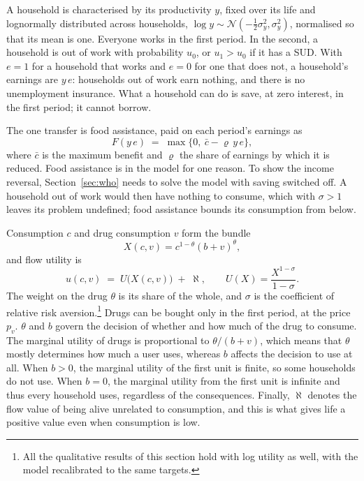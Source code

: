 \documentclass[10pt]{article}
\begin{document}
A household is characterised by its productivity $y$, fixed over its life and lognormally distributed across households, $\log y \sim \mathcal{N}(-\tfrac12\sigma_y^2, \sigma_y^2)$, normalised so that its mean is one. Everyone works in the first period. In the second, a household is out of work with probability $u_0$, or $u_1>u_0$ if it has a SUD. With $e=1$ for a household that works and $e=0$ for one that does not, a household's earnings are $y\,e$: households out of work earn nothing, and there is no unemployment insurance. What a household can do is save, at zero interest, in the first period; it cannot borrow.

The one transfer is food assistance, paid on each period's earnings as
\begin{equation}\label{eq:fs}
F(y\,e) \;=\; \max\{0,\ \bar c-\varrho\, y\,e\},
\end{equation}
where $\bar c$ is the maximum benefit and $\varrho$ the share of earnings by which it is reduced. Food assistance is in the model for one reason. To show the income reversal, Section~\ref{sec:who} needs to solve the model with saving switched off. A household out of work would then have nothing to consume, which with $\sigma>1$ leaves its problem undefined; food assistance bounds its consumption from below.

Consumption $c$ and drug consumption $v$ form the bundle
\begin{equation}\label{eq:bundles}
X(c,v)=c^{1-\theta}(b+v)^{\theta},
\end{equation}
and flow utility is
\begin{equation}\label{eq:u}
u(c,v) \;=\; U\big(X(c,v)\big)\;+\;\aleph,
\qquad U(X)=\frac{X^{1-\sigma}}{1-\sigma}.
\end{equation}
The weight on the
drug $\theta$ is its share of the whole, and $\sigma$ is the coefficient of relative
risk aversion.\footnote{All the qualitative results of this section hold with log utility as well, with the model recalibrated to the same targets.} Drugs can be bought only in the first period, at the price $p_v$.   $\theta$ and $b$ govern the decision of whether and how much of the drug to consume. The marginal utility of drugs is proportional to $\theta/(b+v)$, which means that $\theta$ mostly determines how much a user uses, whereas $b$ affects the decision to use at all. When $b>0$, the marginal utility of the first unit is finite, so some households do not use. When $b=0$, the marginal utility from the first unit is infinite and thus every household uses, regardless of the consequences. Finally, $\aleph$ denotes the flow value of being alive unrelated to consumption, and this is what gives life a positive value even when consumption is low.
\end{document}
